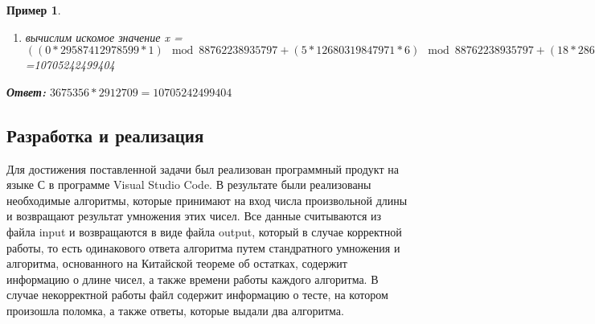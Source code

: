 \documentclass[14pt, russian]{scrartcl}
\newcounter{cExample}
\newtheorem{Example}{Пример}[cExample]
\begin{document}
\begin{Example}
{\begin{enumerate}
\begin{equation*}
\begin{cases}
        M_{1}^{-1}=1, 
        \\
        M_{2}^{-1}=6,
        \\
        M_{3}^{-1}=3,
        \\
        M_{4}^{-1}=34,
        \\
        M_{5}^{-1}=5969,
        \\
        M_{6}^{-1}=93887.
        \end{cases}
    \end{equation*}
    \item вычислим искомое значение x = $((0*29587412978599*1)\mod88762238935797+(5*12680319847971*6)\mod88762238935797+(18*2863298030187*3)\mod88762238935797+(102*698915267211*34)\mod88762238935797+(2537*10836557067*5969)\mod88762238935797+(93393*677207307*93887)\mod88762238935797)\mod88762238935797$=10705242499404
\end{enumerate}
}
\textbf{Ответ:} $3675356*2912709=10705242499404$ 
\end{Example}

\subsection{Разработка и реализация}
Для достижения поставленной задачи был реализован программный продукт на языке С в программе Visual Studio Code. В результате были реализованы необходимые алгоритмы, которые принимают на вход числа произвольной длины и возвращают результат умножения  этих чисел. Все данные считываются из файла input и возвращаются в виде файла output, который в случае корректной работы, то есть одинакового ответа алгоритма путем стандратного умножения и алгоритма, основанного на Китайской теореме об остатках, содержит информацию о длине чисел, а также времени работы каждого алгоритма. В случае некорректной работы файл содержит информацию о тесте, на котором произошла поломка, а также ответы, которые выдали два алгоритма. 
\end{document}
